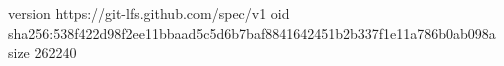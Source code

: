 version https://git-lfs.github.com/spec/v1
oid sha256:538f422d98f2ee11bbaad5c5d6b7baf8841642451b2b337f1e11a786b0ab098a
size 262240

